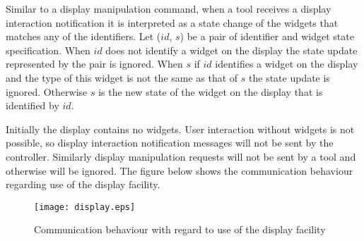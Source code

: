 \documentclass{article}
\begin{document}

   \noindent Similar to a display manipulation command, when a tool receives a
   display interaction notification it is interpreted as a state change of the
   widgets that matches any of the identifiers. Let ($id$, $s$) be a pair of
   identifier and widget state specification. When $id$ does not identify a
   widget on the display the state update represented by the pair is ignored.
   When $s$ if $id$ identifies a widget on the display and the type of this
   widget is not the same as that of $s$ the state update is ignored. Otherwise
   $s$ is the new state of the widget on the display that is identified by
   $id$.


   Initially the display contains no widgets. User interaction without widgets
   is not possible, so display interaction notification messages will not be
   sent by the controller. Similarly display manipulation requests will not be
   sent by a tool and otherwise will be ignored. The figure below shows the
   communication behaviour regarding use of the display facility.

   \begin{figure}[H]
    \begin{center}
     \texttt{[image: display.eps]}
    \end{center}
    \caption{Communication behaviour with regard to use of the display facility}
    \label{figure:display_manipulation}
    \vspace{-0.0cm}
   \end{figure}
\end{document}

